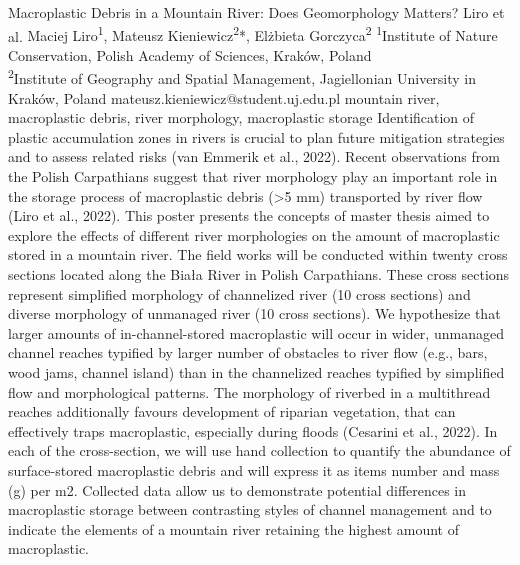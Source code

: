 \abstract
{Macroplastic Debris in a Mountain River: Does Geomorphology Matters?} 
{Liro et al.} 
{Maciej Liro\textsuperscript{1}, Mateusz Kieniewicz\textsuperscript{2}*, Elżbieta Gorczyca\textsuperscript{2}} 
{\POtag} 
{
\textsuperscript{1}Institute of Nature Conservation, Polish Academy of Sciences, Kraków, Poland\\
\textsuperscript{2}Institute of Geography and Spatial Management, Jagiellonian University in Kraków, Poland
}
{mateusz.kieniewicz@student.uj.edu.pl}  %
{mountain river, macroplastic debris, river morphology, macroplastic storage }
{Identification of plastic accumulation zones in rivers is crucial to plan future mitigation strategies and to assess related risks (van Emmerik et al., 2022). Recent observations from the Polish Carpathians suggest that river morphology play an important role in the storage process of macroplastic debris (>5 mm) transported by river flow (Liro et al., 2022). This poster presents the concepts of master thesis aimed to explore the effects of different river morphologies on the amount of macroplastic stored in a mountain river. The field works will be conducted within twenty cross sections located along the Biała River in Polish Carpathians. These cross sections represent simplified morphology of channelized river (10 cross sections) and diverse morphology of unmanaged river (10 cross sections). We hypothesize that larger amounts of in-channel-stored macroplastic will occur in wider, unmanaged channel reaches typified by larger number of obstacles to river flow (e.g., bars, wood jams, channel island) than in the channelized reaches typified by simplified flow and morphological patterns. The morphology of riverbed in a multithread reaches additionally favours development of riparian vegetation, that can effectively traps macroplastic, especially during floods (Cesarini et al., 2022). In each of the cross-section, we will use hand collection to quantify the abundance of surface-stored macroplastic debris and will express it as items number and mass (g) per m2. Collected data allow us to demonstrate potential differences in macroplastic storage between contrasting styles of channel management and to indicate the elements of a mountain river retaining the highest amount of macroplastic.
}
